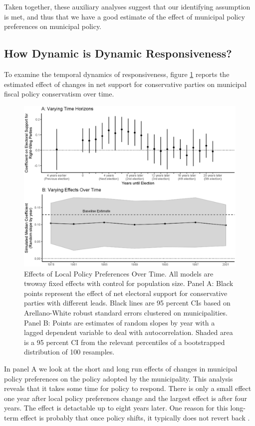 \documentclass[a4paper,12pt]{article}
\begin{document}
Taken together, these auxiliary analyses suggest that our identifying assumption is met, and thus that we have a good estimate of the effect of municipal policy preferences on municipal policy.

\subsection*{How Dynamic is Dynamic Responsiveness?}

To examine the temporal dynamics of responsiveness, figure \ref{fig:LongRun} reports the estimated effect of changes in net support for conservative parties on  municipal fiscal policy conservatism over time.

\begin{figure}[htbp]
	\centering
	\includegraphics[scale = .6]{EffectsVsTime.eps}
	\caption{Effects of Local Policy Preferences Over Time. All models are twoway fixed effects with control for population size. Panel A: Black points represent the effect of net electoral support for conservative parties with different leads. Black lines are 95 percent CIs based on Arellano-White robust standard errors clustered on municipalities. Panel B: Points are estimates of random slopes by year with a lagged dependent variable to deal with autocorrelation. Shaded area is a 95 percent CI from the relevant percentiles of a bootstrapped distribution of 100 resamples.}
	\label{fig:LongRun}
\end{figure}

In panel A we look at the short and long run effects of changes in municipal policy preferences on the policy adopted by the municipality. This analysis reveals that it takes some time for policy to respond. There is only a small effect one year after local policy preferences change and the largest effect is after four years. The effect is detactable up to eight years later. One reason for this long-term effect is probably that once policy shifts, it typically does not revert back \citep[see, theories of punctuated equilibria, e.g.,][]{baumgartner2009punctuated}.
\end{document}
